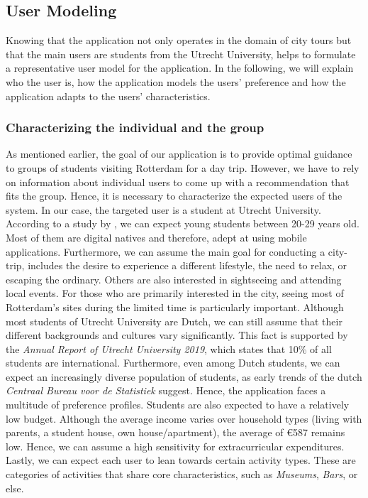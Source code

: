 \documentclass[11pt,a4paper,oneside]{article}
\begin{document}
\subsection{User Modeling}
\label{sec:UM}
Knowing that the application not only operates in the domain of city tours but that the main users are students from the Utrecht University, helps to formulate a representative user model for the application. In the following, we will explain who the user is, how the application models the users' preference and how the application adapts to the users' characteristics. 

\subsubsection{ Characterizing the individual and the group}
As mentioned earlier, the goal of our application is to provide optimal guidance to groups of students visiting Rotterdam for a day trip. However, we have to rely on information about individual users to come up with a recommendation that fits the group. Hence, it is necessary to characterize the expected users of the system. In our case, the targeted user is a student at Utrecht University. According to a study by \citeauthor{AgeAverage_students}, we can expect young students between 20-29 years old.\cite{AgeAverage_students} Most of them are digital natives and therefore, adept at using mobile applications.\cite{prensky_DigitalNativesDigital_2001a} Furthermore, we can assume the main goal for conducting a city-trip, includes the desire to experience a different lifestyle, the need to relax, or escaping the ordinary. Others are also interested in sightseeing and attending local events.\cite{rita2019millennials} For those who are primarily interested in the city, seeing most of Rotterdam's sites during the limited time is particularly important. Although most students of Utrecht University are Dutch, we can still assume that their different backgrounds and cultures vary significantly. This fact is supported by the \emph{Annual Report of Utrecht University 2019}, which states that 10\% of all students are international.\cite{utrecht_UniversiteitUtrecht_2019} Furthermore, even among Dutch students, we can expect an increasingly diverse population of students, as early trends of the dutch \emph{Centraal Bureau voor de Statistiek} suggest.\cite{theovanmiltenburg_AllochtonenHogerOnderwijs_2007} Hence, the application faces a multitude of preference profiles. Students are also expected to have a relatively low budget. Although the average income varies over household types (living with parents, a student house, own house/apartment), the average of €587 remains low.\cite{kobus_OwnershipOncampusUse_2013} Hence, we can assume a high sensitivity for extracurricular expenditures. Lastly, we can expect each user to lean towards certain activity types. These are categories of activities that share core characteristics, such as \emph{Museums}, \emph{Bars}, or else. 
\end{document}
